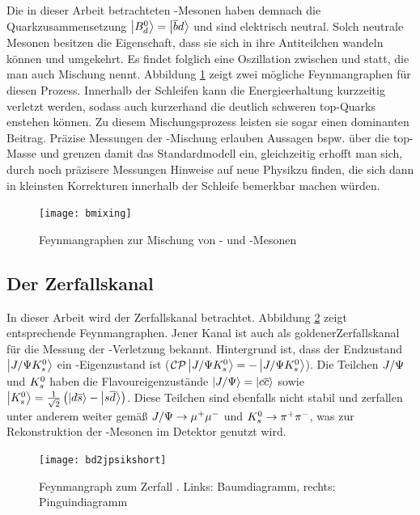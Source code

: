 Die in dieser Arbeit betrachteten \Bd-Mesonen haben demnach die Quarkzusammensetzung $\Ket{\text{$B_d^0$}} = \Ket{\overline{b}d}$ und sind elektrisch neutral. Solch neutrale Mesonen besitzen die Eigenschaft, dass sie sich in ihre Antiteilchen wandeln können und umgekehrt. Es findet folglich eine Oszillation zwischen \Bd und \Bdbar statt, die man auch Mischung nennt. Abbildung \ref{fig:bmixing} zeigt zwei mögliche Feynmangraphen für diesen Prozess. Innerhalb der Schleifen kann die Energieerhaltung kurzzeitig verletzt werden, sodass auch kurzerhand die deutlich schweren top-Quarks enstehen können. Zu diesem Mischungsprozess leisten sie sogar einen dominanten Beitrag. Präzise Messungen der \Bd-Mischung erlauben Aussagen bspw. über die top-Masse und grenzen damit das Standardmodell ein, gleichzeitig erhofft man sich, durch noch präzisere Messungen Hinweise auf \glqq neue Physik\grqq zu finden, die sich dann in kleinsten Korrekturen innerhalb der Schleife bemerkbar machen würden.

\begin{figure}[hptb]
\centering
\texttt{[image: bmixing]}
\caption{Feynmangraphen zur Mischung von \Bd- und \Bdbar-Mesonen}
\label{fig:bmixing}
\end{figure}


\subsection{Der Zerfallskanal \Decaychannel}
In dieser Arbeit wird der Zerfallskanal \Decaychannel betrachtet. Abbildung \ref{fig:decay} zeigt entsprechende Feynmangraphen. Jener Kanal ist auch als \glqq goldener\grqq Zerfallskanal für die Messung der \CP-Verletzung bekannt. Hintergrund ist, dass der Endzustand $\Ket{J/\Psi K_s^0}$ ein \CP-Eigenzustand ist ($\text{$\mathcal{CP}$}\Ket{J/\Psi K_s^0} = - \Ket{J/\Psi K_s^0}$). Die Teilchen $J/\Psi$ und $K_s^0$ haben die Flavoureigenzustände $\Ket{J/\Psi} = \Ket{c\overline{c}}$ sowie $\Ket{K_s^0} = \tfrac{1}{\sqrt{2}}\left(\Ket{d\overline{s}}-\Ket{s\overline{d}}\right)$. Diese Teilchen sind ebenfalls nicht stabil und zerfallen unter anderem weiter gemäß $J/\Psi \rightarrow \mu^+\mu^-$ und $K_s^0 \rightarrow \pi^+\pi^-$, was zur Rekonstruktion der \Bd-Mesonen im Detektor genutzt wird.

\begin{figure}[hptb]
\centering
\texttt{[image: bd2jpsikshort]}
\caption{Feynmangraph zum Zerfall \Decaychannel. Links: Baumdiagramm, rechts: Pinguindiagramm}
\label{fig:decay}
\end{figure}

